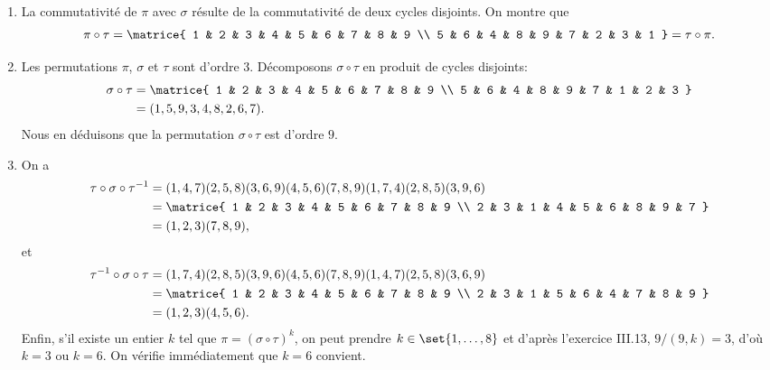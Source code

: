 \begin{enumerate}
  \item  %
    La commutativité de $\pi$ avec $\sigma$ résulte de la commutativité de deux cycles disjoints.
    On montre que
    \[
      \pi\circ\tau = \matrice{
        1 & 2 & 3 & 4 & 5 & 6 & 7 & 8 & 9 \\
        5 & 6 & 4 & 8 & 9 & 7 & 2 & 3 & 1
      } = \tau\circ\pi.
    \]

  \item %
    Les permutations $\pi$, $\sigma$ et $\tau$ sont d'ordre $3$.
    Décomposons $\sigma\circ\tau$ en produit de cycles disjoints:
    \begin{align*}
      \sigma\circ\tau 
        &= \matrice{
            1 & 2 & 3 & 4 & 5 & 6 & 7 & 8 & 9 \\
            5 & 6 & 4 & 8 & 9 & 7 & 1 & 2 & 3
        } \\
        &= (1,5,9,3,4,8,2,6,7).
    \end{align*}
    Nous en déduisons que la permutation $\sigma\circ\tau$ est d'ordre $9$.

  \item %
    On a
    \begin{align*}
      \tau\circ\sigma\circ\tau^{-1}
        &= (1,4,7)(2,5,8)(3,6,9)(4,5,6)(7,8,9)(1,7,4)(2,8,5)(3,9,6) \\
        &= \matrice{
            1 & 2 & 3 & 4 & 5 & 6 & 7 & 8 & 9 \\
            2 & 3 & 1 & 4 & 5 & 6 & 8 & 9 & 7 
        } \\
        &= (1,2,3)(7,8,9),
    \end{align*}
    et
    \begin{align*}
      \tau^{-1}\circ\sigma\circ\tau
        &= (1,7,4)(2,8,5)(3,9,6)(4,5,6)(7,8,9)(1,4,7)(2,5,8)(3,6,9) \\
        &= \matrice{
            1 & 2 & 3 & 4 & 5 & 6 & 7 & 8 & 9 \\
            2 & 3 & 1 & 5 & 6 & 4 & 7 & 8 & 9
        } \\
        &= (1,2,3)(4,5,6).
    \end{align*}
    Enfin, s'il existe un entier $k$ tel que $\pi = (\sigma\circ \tau)^k$, on peut prendre $k\in\set{1,\dots,8}$ et
    d'après l'exercice III.13, $9/(9,k) = 3$, d'où $k = 3$ ou $k = 6$.
    On vérifie immédiatement que $k = 6$ convient.
\end{enumerate}
